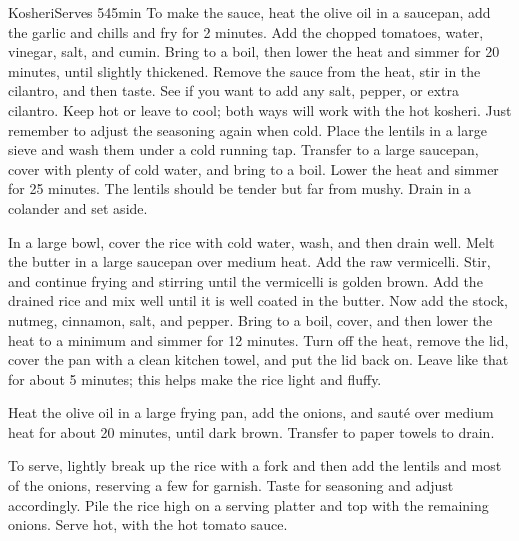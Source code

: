 \begin{recipe}{Kosheri}{Serves 5}{45min}
To make the sauce, heat the olive oil in a saucepan, add the garlic and chills and fry for 2 minutes. Add the chopped tomatoes, water, vinegar, salt, and cumin. Bring to a boil, then lower the heat and simmer for 20 minutes, until slightly thickened. Remove the sauce from the heat, stir in the cilantro, and then taste. See if you want to add any salt, pepper, or extra cilantro. Keep hot or leave to cool; both ways will work with the hot kosheri. Just remember to adjust the seasoning again when cold.
Place the lentils in a large sieve and wash them under a cold running tap. Transfer to a large saucepan, cover with plenty of cold water, and bring to a boil. Lower the heat and simmer for 25 minutes. The lentils should be tender but far from mushy. Drain in a colander and set aside.

In a large bowl, cover the rice with cold water, wash, and then drain well. Melt the butter in a large saucepan over medium heat. Add the raw vermicelli. Stir, and continue frying and stirring until the vermicelli is golden brown. Add the drained rice and mix well until it is well coated in the butter. Now add the stock, nutmeg, cinnamon, salt, and pepper. Bring to a boil, cover, and then lower the heat to a minimum and simmer for 12 minutes. Turn off the heat, remove the lid, cover the pan with a clean kitchen towel, and put the lid back on. Leave like that for about 5 minutes; this helps make the rice light and fluffy.

Heat the olive oil in a large frying pan, add the onions, and sauté over medium heat for about 20 minutes, until dark brown. Transfer to paper towels to drain.

To serve, lightly break up the rice with a fork and then add the lentils and most of the onions, reserving a few for garnish. Taste for seasoning and adjust accordingly. Pile the rice high on a serving platter and top with the remaining onions. Serve hot, with the hot tomato sauce.
\end{recipe}
